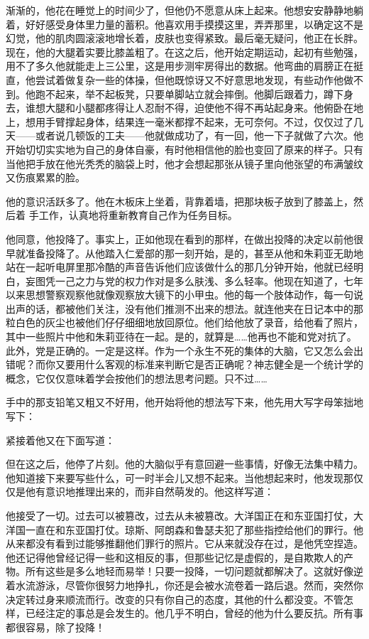 渐渐的，他花在睡觉上的时间少了，但他仍不愿意从床上起来。他想安安静静地躺着，好好感受身体里力量的蓄积。他喜欢用手摸摸这里，弄弄那里，以确定这不是幻觉，他的肌肉圆滚滚地增长着，皮肤也变得紧致。最后毫无疑问，他正在长胖。现在，他的大腿着实要比膝盖粗了。在这之后，他开始定期运动，起初有些勉强，用不了多久他就能走上三公里，这是用步测牢房得出的数据。他弯曲的肩膀正在挺直，他尝试着做复杂一些的体操，但他既惊讶又不好意思地发现，有些动作他做不到。他跑不起来，举不起板凳，只要单脚站立就会摔倒。他脚后跟着力，蹲下身去，谁想大腿和小腿都疼得让人忍耐不得，迫使他不得不再站起身来。他俯卧在地上，想用手臂撑起身体，结果连一毫米都撑不起来，无可奈何。不过，仅仅过了几天——或者说几顿饭的工夫——他就做成功了，有一回，他一下子就做了六次。他开始切切实实地为自己的身体自豪，有时他相信他的脸也变回了原来的样子。只有当他把手放在他光秃秃的脑袋上时，他才会想起那张从镜子里向他张望的布满皱纹又伤痕累累的脸。

他的意识活跃多了。他在木板床上坐着，背靠着墙，把那块板子放到了膝盖上，然后着
手工作，认真地将重新教育自己作为任务目标。

他同意，他投降了。事实上，正如他现在看到的那样，在做出投降的决定以前他很早就准备投降了。从他踏入仁爱部的那一刻开始，是的，甚至从他和朱莉亚无助地站在一起听电屏里那冷酷的声音告诉他们应该做什么的那几分钟开始，他就已经明白，妄图凭一己之力与党的权力作对是多么肤浅、多么轻率。他现在知道了，七年以来思想警察观察他就像观察放大镜下的小甲虫。他的每一个肢体动作，每一句说出声的话，都被他们关注，没有他们推测不出来的想法。就连他夹在日记本中的那粒白色的灰尘也被他们仔仔细细地放回原位。他们给他放了录音，给他看了照片，其中一些照片中他和朱莉亚待在一起。是的，就算是\ldots\ldots 他再也不能和党对抗了。此外，党是正确的。一定是这样。作为一个永生不死的集体的大脑，它又怎么会出错呢？而你又要用什么客观的标准来判断它是否正确呢？神志健全是一个统计学的概念，它仅仅意味着学会按他们的想法思考问题。只不过\ldots\ldots{}

手中的那支铅笔又粗又不好用，他开始将他的想法写下来，他先用大写字母笨拙地写下：


紧接着他又在下面写道：


但在这之后，他停了片刻。他的大脑似乎有意回避一些事情，好像无法集中精力。他知道接下来要写些什么，可一时半会儿又想不起来。当他想起来时，他发现那仅仅是他有意识地推理出来的，而非自然萌发的。他这样写道：


他接受了一切。过去可以被篡改，过去从未被篡改。大洋国正在和东亚国打仗，大洋国一直在和东亚国打仗。琼斯、阿朗森和鲁瑟夫犯了那些指控给他们的罪行。他从来都没有看到过能够推翻他们罪行的照片。它从来就没存在过，是他凭空捏造。他还记得他曾经记得一些和这相反的事，但那些记忆是虚假的，是自欺欺人的产物。所有这些是多么地轻而易举！只要一投降，一切问题就都解决了。这就好像逆着水流游泳，尽管你很努力地挣扎，你还是会被水流卷着一路后退。然而，突然你决定转过身来顺流而行。改变的只有你自己的态度，其他的什么都没变。不管怎样，已经注定的事总是会发生的。他几乎不明白，曾经的他为什么要反抗。所有事都很容易，除了投降！

